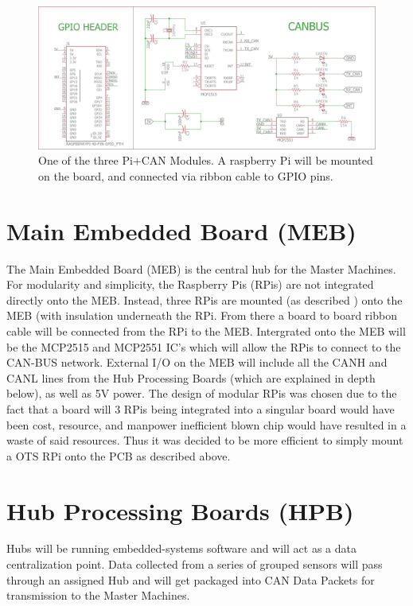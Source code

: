 \documentclass[main.tex]{subfiles}
\begin{document}
      \begin{figure}
        \centering
        \includegraphics[width=\textwidth]{images/MEB_Module.png}
        \caption{One of the three Pi+CAN Modules. A raspberry Pi will be mounted on the board, and connected via ribbon cable to GPIO pins.}
        \label{fig:meb-module}
    \end{figure}

    \section{Main Embedded Board (MEB)}
    The Main Embedded Board (MEB) is the central hub for the Master Machines. For modularity and simplicity, the Raspberry Pis (RPis) are not integrated directly onto the MEB. Instead, three RPis are mounted (as described ) onto the MEB (with insulation underneath the RPi. From there a board to board ribbon cable will be connected from the RPi to the MEB. Intergrated onto the MEB will be the MCP2515 and MCP2551 IC's which will allow the RPis to connect to the CAN-BUS network. External I/O on the MEB will include all the CANH and CANL lines from the Hub Processing Boards (which are explained in depth below), as well as 5V power. The design of modular RPis was chosen due to the fact that a board will 3 RPis being integrated into a singular board would have been cost, resource, and manpower inefficient
blown chip would have resulted in a waste of said resources. Thus it was decided to be more efficient to simply mount a OTS RPi onto the PCB as described above.


    \section{Hub Processing Boards (HPB)}
   	Hubs will be running embedded-systems software and will act as a data centralization point. Data collected from a series of grouped sensors will pass through an assigned Hub and will get packaged into CAN Data Packets for transmission to the Master Machines.\\
\end{document}
